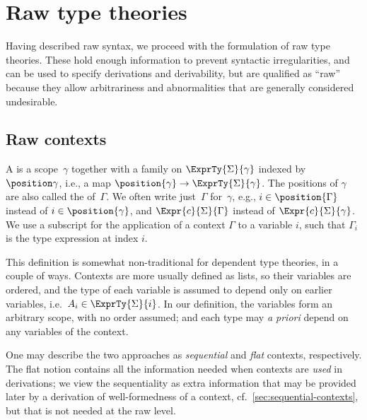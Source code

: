 \section{Raw type theories}
\label{sec:typing}

Having described raw syntax, we proceed with the formulation of raw type theories. These hold enough information to prevent syntactic irregularities, and can be used to specify derivations and derivability, but are qualified as ``raw'' because they allow arbitrariness and abnormalities that are generally considered undesirable.

\subsection{Raw contexts}

\begin{definition}
  \label{def:raw-context}%
  A  is a scope~$\gamma$ together with a family on $\ExprTy{\Sigma}{\gamma}$ indexed by $\position \gamma$, i.e., a map $\position{\gamma} \to \ExprTy{\Sigma}{\gamma}$.
  The positions of $\gamma$ are also called the  of~$\Gamma$.
  We often write just~$\Gamma$ for~$\gamma$, e.g., $i \in \position{\Gamma}$ instead of $i \in \position{\gamma}$, and $\Expr{c}{\Sigma}{\Gamma}$ instead of $\Expr{c}{\Sigma}{\gamma}$.
  We use a subscript for the application of a context $\Gamma$ to a variable $i$, such that $\Gamma_i$ is the type expression at index $i$.
\end{definition}

This definition is somewhat non-traditional for dependent type theories, in a couple of ways.
%
Contexts are more usually defined as lists, so their variables are ordered, and the type of each variable is assumed to depend only on earlier variables, i.e.~$A_i \in \ExprTy{\Sigma}{i}$.
%
In our definition, the variables form an arbitrary scope, with no order assumed; and each type may \emph{a priori} depend on any variables of the context.

One may describe the two approaches as \emph{sequential} and \emph{flat} contexts, respectively.
%
The flat notion contains all the information needed when contexts are \emph{used} in derivations; we view the sequentiality as extra information that may be provided later by a derivation of well-formedness of a context, cf.\ \cref{sec:sequential-contexts}, but that is not needed at the raw level.

